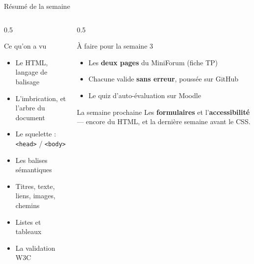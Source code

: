 \documentclass[aspectratio=169,11pt]{beamer}
\begin{document}
\begin{frame}{Résumé de la semaine}
  \begin{columns}[T]
    \begin{column}{0.5\textwidth}
      \begin{block}{Ce qu'on a vu}
        \begin{itemize}
          \item Le HTML, langage de balisage
          \item L'imbrication, et l'arbre du document
          \item Le squelette : \texttt{<head>} / \texttt{<body>}
          \item Les balises sémantiques
          \item Titres, texte, liens, images, chemins
          \item Listes et tableaux
          \item La validation W3C
        \end{itemize}
      \end{block}
    \end{column}
    \begin{column}{0.5\textwidth}
      \begin{alertblock}{À faire pour la semaine 3}
        \begin{itemize}
          \item Les \textbf{deux pages} du MiniForum (fiche TP)
          \item Chacune valide \textbf{sans erreur}, poussée sur GitHub
          \item Le quiz d'auto-évaluation sur Moodle
        \end{itemize}
      \end{alertblock}
      \vspace{0.15cm}
      \begin{exampleblock}{La semaine prochaine}
        Les \textbf{formulaires} et l'\textbf{accessibilité} --- encore du HTML, et la dernière semaine avant le CSS.
      \end{exampleblock}
    \end{column}
  \end{columns}
\end{frame}

{
\begin{frame}[plain]
\end{frame}
}
\end{document}

